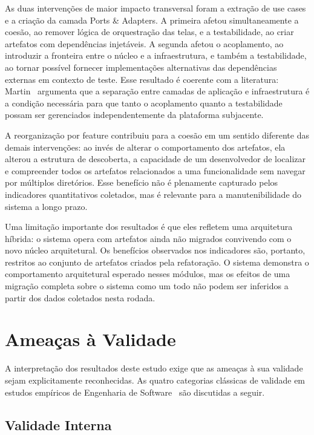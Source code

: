 \documentclass[sigconf,anonymous]{acmart}
\begin{document}
As duas intervenções de maior impacto transversal foram a extração de use cases e a criação da camada Ports \& Adapters. A primeira afetou simultaneamente a coesão, ao remover lógica de orquestração das telas, e a testabilidade, ao criar artefatos com dependências injetáveis. A segunda afetou o acoplamento, ao introduzir a fronteira entre o núcleo e a infraestrutura, e também a testabilidade, ao tornar possível fornecer implementações alternativas das dependências externas em contexto de teste. Esse resultado é coerente com a literatura: Martin~\cite{Martin2017} argumenta que a separação entre camadas de aplicação e infraestrutura é a condição necessária para que tanto o acoplamento quanto a testabilidade possam ser gerenciados independentemente da plataforma subjacente.

A reorganização por feature contribuiu para a coesão em um sentido diferente das demais intervenções: ao invés de alterar o comportamento dos artefatos, ela alterou a estrutura de descoberta, a capacidade de um desenvolvedor de localizar e compreender todos os artefatos relacionados a uma funcionalidade sem navegar por múltiplos diretórios. Esse benefício não é plenamente capturado pelos indicadores quantitativos coletados, mas é relevante para a manutenibilidade do sistema a longo prazo.

Uma limitação importante dos resultados é que eles refletem uma arquitetura híbrida: o sistema opera com artefatos ainda não migrados convivendo com o novo núcleo arquitetural. Os benefícios observados nos indicadores são, portanto, restritos ao conjunto de artefatos criados pela refatoração. O sistema demonstra o comportamento arquitetural esperado nesses módulos, mas os efeitos de uma migração completa sobre o sistema como um todo não podem ser inferidos a partir dos dados coletados nesta rodada.

\section{Ameaças à Validade}

A interpretação dos resultados deste estudo exige que as ameaças à sua validade sejam explicitamente reconhecidas. As quatro categorias clássicas de validade em estudos empíricos de Engenharia de Software~\cite{Yin2014} são discutidas a seguir.

\subsection{Validade Interna}
\end{document}
